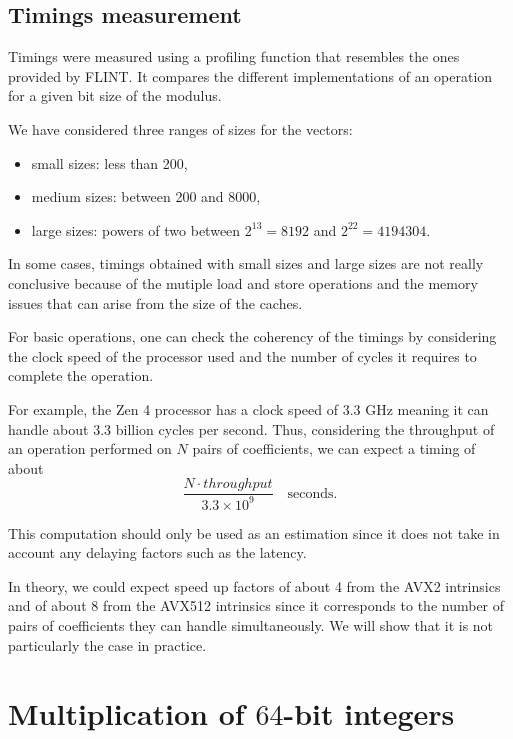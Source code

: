 \documentclass[a4paper]{article}
\begin{document}
\subsection{Timings measurement}

Timings were measured using a profiling function that resembles the ones provided by FLINT.
It compares the different implementations of an operation for a given bit size of the modulus.

\bigskip
We have considered three ranges of sizes for the vectors:
\begin{itemize}
    \item small sizes: less than 200, 
    \item medium sizes: between 200 and 8000,
    \item large sizes: powers of two between $2^{13}=8192$ and $2^{22}=4194304$.
\end{itemize}

In some cases, timings obtained with small sizes and large sizes are not really conclusive because of
the mutiple load and store operations and the memory issues that can arise from the size of the caches.

\begin{remark}
    For basic operations, one can check the coherency of the timings by considering the clock speed of
    the processor used and the number of cycles it requires to complete the operation.
    
    For example, the Zen 4 processor has a clock speed of 3.3 GHz meaning it can handle about 
    3.3 billion cycles per second. Thus, considering the throughput of an operation performed on
    $N$ pairs of coefficients, we can expect a timing of about
    \[
    \dfrac{N\cdot throughput}{3.3\times 10^9}\quad \text{seconds}.
    \]

    This computation should only be used as an estimation since it does not take in account any
    delaying factors such as the latency.
\end{remark}

\bigskip
In theory, we could expect speed up factors of about 4 from the AVX2 intrinsics and of about 8 from the AVX512 intrinsics
since it corresponds to the number of pairs of coefficients they can handle simultaneously.
We will show that it is not particularly the case in practice.


\section{Multiplication of $64$-bit integers} 
\end{document}
